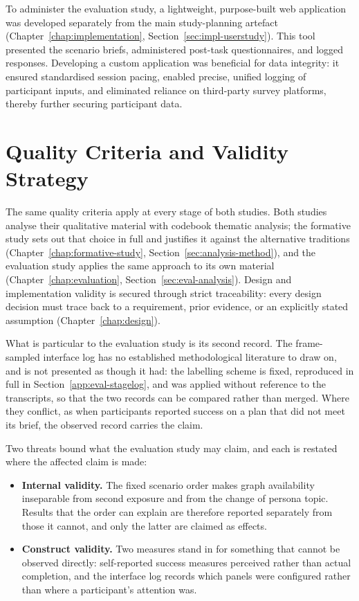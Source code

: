 To administer the evaluation study, a lightweight, purpose-built web application was developed separately from the main study-planning artefact (Chapter~\ref{chap:implementation}, Section~\ref{sec:impl-userstudy}). This tool presented the scenario briefs, administered post-task questionnaires, and logged responses. Developing a custom application was beneficial for data integrity: it ensured standardised session pacing, enabled precise, unified logging of participant inputs, and eliminated reliance on third-party survey platforms, thereby further securing participant data.

\section{Quality Criteria and Validity Strategy}
\label{sec:validity-overview}

The same quality criteria apply at every stage of both studies. Both studies analyse their qualitative material with codebook thematic analysis; the formative study sets out that choice in full and justifies it against the alternative traditions (Chapter~\ref{chap:formative-study}, Section~\ref{sec:analysis-method}), and the evaluation study applies the same approach to its own material (Chapter~\ref{chap:evaluation}, Section~\ref{sec:eval-analysis}). Design and implementation validity is secured through strict traceability: every design decision must trace back to a requirement, prior evidence, or an explicitly stated assumption (Chapter~\ref{chap:design}).

What is particular to the evaluation study is its second record. The frame-sampled interface log has no established methodological literature to draw on, and is not presented as though it had: the labelling scheme is fixed, reproduced in full in Section~\ref{app:eval-stagelog}, and was applied without reference to the transcripts, so that the two records can be compared rather than merged. Where they conflict, as when participants reported success on a plan that did not meet its brief, the observed record carries the claim.

Two threats bound what the evaluation study may claim, and each is restated where the affected claim is made:
\begin{itemize}
    \item \textbf{Internal validity.} The fixed scenario order makes graph availability inseparable from second exposure and from the change of persona topic. Results that the order can explain are therefore reported separately from those it cannot, and only the latter are claimed as effects.
    \item \textbf{Construct validity.} Two measures stand in for something that cannot be observed directly: self-reported success measures perceived rather than actual completion, and the interface log records which panels were configured rather than where a participant's attention was.
\end{itemize}
